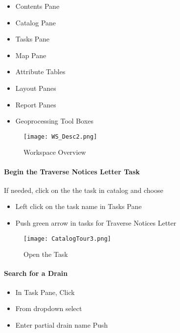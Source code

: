 \begin{itemize}
\item Contents Pane
\item Catalog Pane
\item Tasks Pane
\item Map Pane
\item Attribute Tables
\item Layout Panes
\item Report Panes
\item Geoprocessing Tool Boxes
\end{itemize}

\begin{figure}[h!]
 \centering
     \texttt{[image: WS\_Desc2.png]}
 \caption{Workspace Overview}
 \end{figure}

\clearpage

\paragraph{Begin the Traverse Notices Letter Task}
If needed, click on the the task in catalog and choose {\bigbtn{}}
\begin{itemize}

\item Left click on the task name in Tasks Pane
\item Push green arrow in tasks for Traverse Notices Letter

\end{itemize}
\begin{figure}[h!]
 \centering
     \texttt{[image: CatalogTour3.png]}
 \caption{Open the Task}
 \end{figure}


\clearpage

\paragraph{Search for a Drain}

\begin{itemize}

\item In Task Pane, {\bigbtn Click } 
\item From dropdown select {\menuArrow}{\bigbtn {}}
\item Enter partial drain name {\menuArrow}{\bigbtn Push }

\end{itemize}

